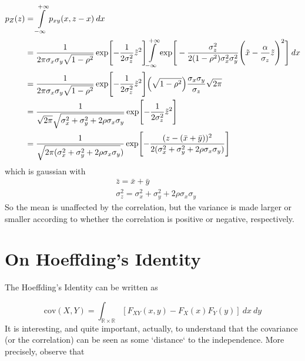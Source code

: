 \documentclass{article}
\begin{document}
\begin{equation}
    \begin{split}
        p_Z(z) & = \int\limits_{-\infty}^{+\infty} p_{xy}(x, z-x) \> dx \\
        & = \frac{1}{2\pi \sigma_x \sigma_y \sqrt{1-\rho^2}}
        \exp \Biggl[ - \frac{1}{2 \sigma^2_z} {\tilde z}^2 \Biggl]
        \int\limits_{-\infty}^{+\infty}
        \exp \Biggr[ 
        - \frac{\sigma^2_z}{2(1-\rho^2)\sigma^2_x\sigma^2_y} \Biggl( \tilde x - \frac{\alpha}{\sigma_z} \tilde z \Biggr)^2
        \Biggr] \> dx \\
        & = \frac{1}{2\pi \sigma_x \sigma_y \sqrt{1-\rho^2}}
        \exp \Biggl[ - \frac{1}{2 \sigma^2_z} {\tilde z}^2 \Biggl] \Bigl( \sqrt{1-\rho^2} \Bigr)  \frac{\sigma_x \sigma_y}{\sigma_z}\sqrt{2\pi} \\
        & = \frac{1}{\sqrt{2\pi}\sqrt{\sigma_x^2 + \sigma_y^2 + 2 \rho \sigma_x \sigma_y}} \exp \Biggl[ - \frac{1}{2 \sigma^2_z} {\tilde z}^2 \Biggl] \\
        & = \frac{1}{\sqrt{2\pi (\sigma_x^2 + \sigma_y^2 + 2 \rho \sigma_x \sigma_y})}
        \exp\Biggl[
        -\frac{(z - (\bar x + \bar y))^2}{2(\sigma^2_x + \sigma_y^2 + 2 \rho \sigma_x \sigma_y)}
        \Biggr]
    \end{split}
\end{equation}
which is gaussian with
\begin{equation}
    \begin{split}
        & \bar z = \bar x + \bar y  \\
        & \sigma_z^2 = \sigma_x^2 + \sigma_y^2 + 2\rho \sigma_x \sigma_y
    \end{split}
\end{equation}
So the mean is unaffected by the correlation, but the variance is made larger or smaller according to whether the correlation is positive or negative, respectively. 
%
%
\section{On Hoeffding's Identity}

The Hoeffding's Identity can be written as

\begin{equation}
\text{cov}(X,Y)=\int_{\mathbb{R}\times\mathbb{R}}[F_{XY}(x,y)-F_X(x) F_Y(y)]\>dx\>dy 
\end{equation}
It is interesting, and quite important, actually, to understand that the covariance (or the correlation) can be seen as some ‘distance‘ to the independence. More precisely, observe that
\end{document}
